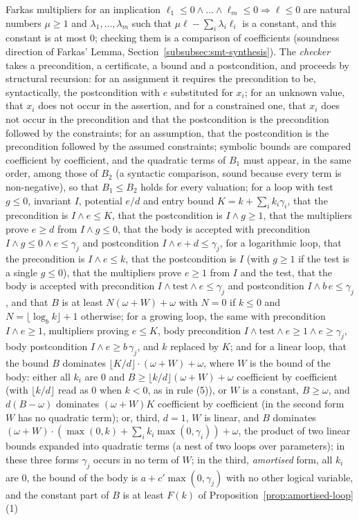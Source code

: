 \documentclass[oneside,english]{amsart}
\numberwithin{equation}{section}
\numberwithin{figure}{section}
\theoremstyle{plain}
\theoremstyle{definition}
\theoremstyle{plain}
\theoremstyle{remark}
\theoremstyle{plain}
\theoremstyle{definition}
\theoremstyle{plain}
\theoremstyle{remark}
\begin{document}
Farkas multipliers for an implication $\ell_1 \le 0 \wedge \dots \wedge \ell_m \le 0 \Rightarrow \ell \le 0$ are natural numbers $\mu \ge 1$ and $\lambda_1, \dots, \lambda_m$ such that $\mu \ell - \sum_i \lambda_i \ell_i$ is a constant, and this constant is at most $0$; checking them is a comparison of coefficients (soundness direction of Farkas' Lemma, Section~\ref{subsubsec:smt-synthesis}). The \emph{checker} takes a precondition, a certificate, a bound and a postcondition, and proceeds by structural recursion: for an assignment it requires the precondition to be, syntactically, the postcondition with $e$ substituted for $x_i$; for an unknown value, that $x_i$ does not occur in the assertion, and for a constrained one, that $x_i$ does not occur in the precondition and that the postcondition is the precondition followed by the constraints; for an assumption, that the postcondition is the precondition followed by the assumed constraints; symbolic bounds are compared coefficient by coefficient, and the quadratic terms of $B_1$ must appear, in the same order, among those of $B_2$ (a syntactic comparison, sound because every term is non-negative), so that $B_1 \le B_2$ holds for every valuation; for a loop with test $g \le 0$, invariant $I$, potential $e/d$ and entry bound $K = k + \sum_i k_i \gamma_i$, that the precondition is $I \wedge e \le K$, that the postcondition is $I \wedge g \ge 1$, that the multipliers prove $e \ge d$ from $I \wedge g \le 0$, that the body is accepted with precondition $I \wedge g \le 0 \wedge e \le \gamma_j$ and postcondition $I \wedge e + d \le \gamma_j$, for a logarithmic loop, that the precondition is $I \wedge e \le k$, that the postcondition is $I$ (with $g \ge 1$ if the test is a single $g \le 0$), that the multipliers prove $e \ge 1$ from $I$ and the test, that the body is accepted with precondition $I \wedge \text{test} \wedge e \le \gamma_j$ and postcondition $I \wedge b\,e \le \gamma_j$, and that $B$ is at least $N(\omega + W) + \omega$ with $N = 0$ if $k \le 0$ and $N = \lfloor \log_b k \rfloor + 1$ otherwise; for a growing loop, the same with precondition $I \wedge e \ge 1$, multipliers proving $e \le K$, body precondition $I \wedge \text{test} \wedge e \ge 1 \wedge e \ge \gamma_j$, body postcondition $I \wedge e \ge b\,\gamma_j$, and $k$ replaced by $K$; and for a linear loop, that the bound $B$ dominates $\lfloor K/d \rfloor \cdot (\omega + W) + \omega$, where $W$ is the bound of the body: either all $k_i$ are $0$ and $B \ge \lfloor k/d \rfloor (\omega + W) + \omega$ coefficient by coefficient (with $\lfloor k/d \rfloor$ read as $0$ when $k < 0$, as in rule (5)), or $W$ is a constant, $B \ge \omega$, and $d (B - \omega)$ dominates $(\omega + W) K$ coefficient by coefficient (in the second form $W$ has no quadratic term); or, third, $d = 1$, $W$ is linear, and $B$ dominates $(\omega + W) \cdot (\max(0, k) + \sum_i k_i \max(0, \gamma_i)) + \omega$, the product of two linear bounds expanded into quadratic terms (a nest of two loops over parameters); in these three forms $\gamma_j$ occurs in no term of $W$; in the third, \emph{amortised} form, all $k_i$ are $0$, the bound of the body is $a + c' \max(0, \gamma_j)$ with no other logical variable, and the constant part of $B$ is at least $F(k)$ of Proposition~\ref{prop:amortised-loop}(1) 
\end{document}
